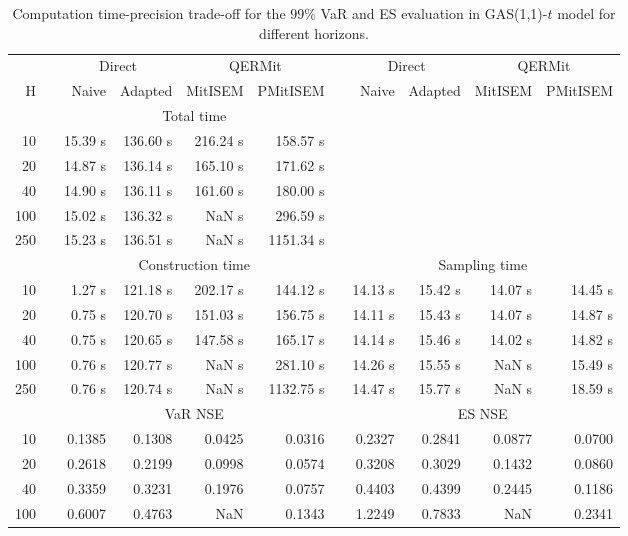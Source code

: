 \footnotesize{  
{ \renewcommand{\arraystretch}{1.3} 
\begin{longtable}{rr rrrr r rrrr}  
\caption{Computation time-precision trade-off for the  $99\%$ VaR and ES evaluation in GAS(1,1)-$t$ model for different horizons.} 
\label{tab:time_precision_t_gas} \\ 
 & & \multicolumn{2}{c}{Direct} & \multicolumn{2}{c}{QERMit}&  & \multicolumn{2}{c}{Direct} & \multicolumn{2}{c}{QERMit} \\ \cline{3-6} \cline{8-11} 
 H & & Naive & Adapted & MitISEM & PMitISEM & & Naive & Adapted & MitISEM & PMitISEM \\ \hline 
 & & \multicolumn{4}{c}{Total time}  \\ \cline{3-6} 
10 & & 15.39 s & 136.60 s & 216.24 s & 158.57 s \\ 
20 & & 14.87 s & 136.14 s & 165.10 s & 171.62 s \\ 
40 & & 14.90 s & 136.11 s & 161.60 s & 180.00 s \\ 
100 & & 15.02 s & 136.32 s &  NaN s & 296.59 s \\ 
250 & & 15.23 s & 136.51 s &  NaN s & 1151.34 s \\ 
\hline 
 & & \multicolumn{4}{c}{Construction time} & & \multicolumn{4}{c}{ Sampling time} \\ \cline{3-6}  \cline{8-11}
10 & & 1.27 s & 121.18 s & 202.17 s & 144.12 s && 14.13 s & 15.42 s & 14.07 s & 14.45 s \\ 
20 & & 0.75 s & 120.70 s & 151.03 s & 156.75 s && 14.11 s & 15.43 s & 14.07 s & 14.87 s \\ 
40 & & 0.75 s & 120.65 s & 147.58 s & 165.17 s && 14.14 s & 15.46 s & 14.02 s & 14.82 s \\ 
100 & & 0.76 s & 120.77 s &  NaN s & 281.10 s && 14.26 s & 15.55 s &  NaN s & 15.49 s \\ 
250 & & 0.76 s & 120.74 s &  NaN s & 1132.75 s && 14.47 s & 15.77 s &  NaN s & 18.59 s \\ 
\hline 
 & & \multicolumn{4}{c}{VaR NSE} &&  \multicolumn{4}{c}{ES NSE} \\ \cline{3-6}  \cline{8-11}
10 && 0.1385  & 0.1308  & 0.0425 & 0.0316 && 0.2327  & 0.2841  & 0.0877 & 0.0700 \\ 
20 && 0.2618  & 0.2199  & 0.0998 & 0.0574 && 0.3208  & 0.3029  & 0.1432 & 0.0860 \\ 
40 && 0.3359  & 0.3231  & 0.1976 & 0.0757 && 0.4403  & 0.4399  & 0.2445 & 0.1186 \\ 
100 && 0.6007  & 0.4763  &    NaN & 0.1343 && 1.2249  & 0.7833  &    NaN & 0.2341 \\ 

\end{longtable}}}
